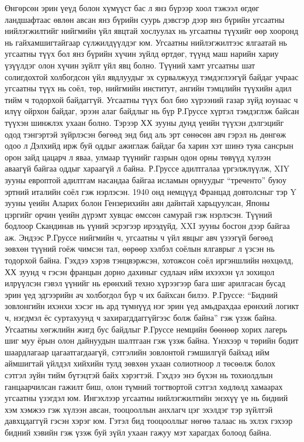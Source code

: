 Өнгөрсөн эрин үеүд болон хүмүүст бас л янз бүрээр хоол тэжээл өгдөг ландшафтаас өвлөн авсан янз бүрийн суурь дэвсгэр дээр янз бүрийн угсаатны нийлэгжилтийг нийгмийн үйл явцтай хослуулах нь угсаатны түүхийг өөр хооронд нь гайхамшигтайгаар сүлжилдүүлдэг юм. Угсаатны нийлэгжилтээс ялгаатай нь угсаатны түүх бол янз бүрийн хүчин зүйлд өртдөг, түүнд маш нарийн хариу үзүүлдэг олон хүчин зүйлт үйл явц болно. Түүний хамт угсаатны шат солигдохтой холбогдсон үйл явдлуудыг эх сурвалжууд тэмдэглээгүй байдаг учраас угсаатны түүх нь соёл, төр, нийгмийн институт, ангийн тэмцлийн түүхийн адил тийм ч тодорхой байдаггүй. Угсаатны түүх бол био хүрээний газар зүйд юунаас ч илүү ойрхон байдаг, эрээн алаг байдлыг нь бүр Р.Груссе хүртэл тэмдэглэж байсан түүхэн шинжлэх ухаан болно. Тэрээр ХХ зууны дунд үеийн түүхэн дэлгэцийг одод тэнгэртэй зүйрлэсэн бөгөөд энд бид аль эрт сөнөсөн авч гэрэл нь дөнгөж одоо л Дэлхийд ирж буй оддыг ажиглаж байдаг ба харин хэт шинэ туяа сансрын орон зайд цацарч л яваа, улмаар түүнийг газрын одон орны төвүүд хүлээн аваагүй байгаа оддыг хараагүй л байна. Р.Груссе адилтгалаа үргэлжлүүлж, XIY зууны европтой адилтгам насандаа байгаа исламын орнуудыг “треченто” буюу эртний италийн соёл гэж нэрлэсэн. 1940 онд немцүүд Францад довтолсныг тэр Y зууны үеийн Аларих болон Гензерихийн аян дайнтай харьцуулсан, Японы цэргийг орчин үеийн дүрэмт хувцас өмссөн самурай гэж нэрлэсэн. Түүний бодлоор Скандинав нь үүний эсрэгээр ирээдүйд, XXI зууны босгон дээр байгаа аж. Эндээс Р.Груссе нийгмийн ч, угсаатны ч үйл явцыг авч үзээгүй бөгөөд зөвхөн түүний гоёж чимсэн тал, өөрөөр хэлбэл соёлын ялгаврыг л үзсэн нь тодорхой байна.
Гэхдээ хэрэв тэнцвэржсэн, хотожсон соёл иргэншлийн нөхцөлд, ХХ зуунд ч гэсэн францын дорно дахиныг судлаач ийм ихээхэн үл зохицол илрүүлсэн гэвэл үүнийг нь ерөнхий техно хүрээгээр бага шиг арилгасан бусад эрин үед эдгээрийн ач холбогдол бүр ч их байхсан билээ. Р.Груссе: “Бидний зовлонгийн ихэнхи хэсэг нь ард түмнүүд нэг эрин үед амьдрахдаа ерөнхий логикт ч, нэгдмэл ёс суртахуунд ч захирагддаггүйгээс болж байна” гэж үзэж байна. Угсаатны хөгжлийн жигд бус байдлыг Р.Груссе немцийн бөөнөөр хорих лагерь шиг муу ёрын олон дайнуудын шалтгаан гэж үзэж байна. Үнэхээр ч төрийн бодит шаардлагаар цагаатгагдаагүй, сэтгэлийн зовлонтой гэмшилгүй байхад ийм аймшигтай үйлдэл хийхийн тулд зөвхөн ухаан солиотноор л төсөөлж болох сэтгэл зүйн тийм бүтэцтэй байх хэрэгтэй. Гэхдээ энэ бүхэн нь тохиолдлын ганцаарчилсан гажилт биш, олон түмний тогтвортой сэтгэл хөдлөлд хамаарах угсаатны үзэгдэл юм. Ингэхлээр угсаатны нийлэгжилтийн энэхүү үе нь бидний хэм хэмжээ гэж хүлээн авсан, тооцооллын анхлагч цэг эхэлдэг тэр зүйлтэй давхцдаггүй гэсэн хэрэг юм. Гэтэл бид тооцооллыг нөгөө талаас нь эхлэх гэхээр бидний хэвийн гэж үзэж буй зүйл ухаан гажуу мэт харагдах болоод байна.
